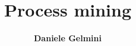 \documentclass[a4paper,aps,secnumarabic,balancelastpage,amsmath,amssymb,nofootinbib,floatfix]{report}
\begin{document}
\title{\textbf{Process mining}}
\author{\textbf{Daniele Gelmini}}
\date{}
\maketitle
\tableofcontents













    
\end{document}
